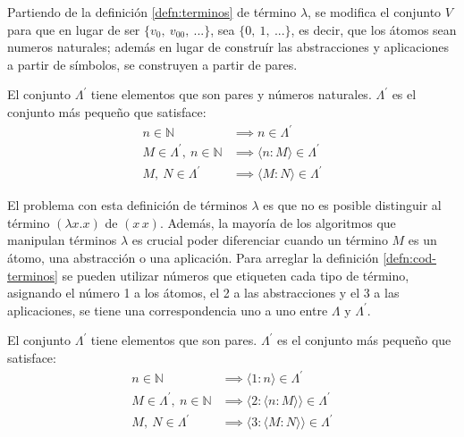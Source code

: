 Partiendo de la definición \ref{defn:terminos} de término \( λ \), se modifica el conjunto \( V \) para que en lugar de ser \( \{v_{0},\ v_{00},\ ... \} \), sea \( \{ 0,\ 1,\ ... \} \), es decir, que los átomos sean numeros naturales; además en lugar de construír las abstracciones y aplicaciones a partir de símbolos, se construyen a partir de pares.

\begin{defn}[Términos \( λ \)]
  El conjunto \( Λ^{\prime} \) tiene elementos que son pares y números naturales. \( Λ^{\prime} \) es el conjunto más pequeño que satisface:
  \label{defn:cod-terminos}
  \begin{subequations}
    \begin{align}
      \label{cod-terminos:atomos} \tag{a}
      n \in \mathbb{N} & \implies n \in Λ^{\prime} \\
      \label{cod-terminos:abstracciones} \tag{b}
      M \in Λ^{\prime},\ n \in \mathbb{N} & \implies  \langle n : M \rangle \in Λ^{\prime} \\
      \label{cod-terminos:aplicaciones} \tag{c}
      M,\ N \in Λ^{\prime} & \implies \langle M : N \rangle \in Λ^{\prime}
    \end{align}
  \end{subequations}
\end{defn}

El problema con esta definición de términos \( λ \) es que no es posible distinguir al término \( (λx.x) \) de \( (x\, x) \). Además, la mayoría de los algoritmos que manipulan términos \( λ \) es crucial poder diferenciar cuando un término \( M \) es un átomo, una abstracción o una aplicación. Para arreglar la definición \ref{defn:cod-terminos} se pueden utilizar números que etiqueten cada tipo de término, asignando el número 1 a los átomos, el 2 a las abstracciones y el 3 a las aplicaciones, se tiene una correspondencia uno a uno entre \( Λ \) y \( Λ^{\prime} \).

\begin{defn}[Términos \( λ \)]
  El conjunto \( Λ^{\prime} \) tiene elementos que son pares. \( Λ^{\prime} \) es el conjunto más pequeño que satisface:
  \label{defn:cod-terminos2}
  \begin{subequations}
    \begin{align}
      \label{cod-terminos:atomos2} \tag{a}
      n \in \mathbb{N} & \implies \langle 1 : n \rangle \in Λ^{\prime} \\
      \label{cod-terminos:abstracciones2} \tag{b}
      M \in Λ^{\prime},\ n \in \mathbb{N} & \implies \langle 2 : \langle n : M \rangle \rangle \in Λ^{\prime} \\
      \label{cod-terminos:aplicaciones2} \tag{c}
      M,\ N \in Λ^{\prime} & \implies \langle 3 : \langle M : N \rangle \rangle \in Λ^{\prime}
    \end{align}
  \end{subequations}
\end{defn}

